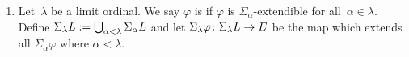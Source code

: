 \documentclass[main.tex]{subfiles}
\begin{document}
\begin{dfn}
\begin{enumerate}
\item
Let~$\lambda$ be a limit ordinal.
We say $\varphi$ is 
if $\varphi$ is $\Sigma_\alpha$-extendible
for all~$\alpha \in \lambda$.
Define 
$\Sigma_\lambda L := \textstyle{\bigcup_{\alpha < \lambda} \Sigma_\alpha L}$
and let $\Sigma_\lambda \varphi\colon \Sigma_\lambda L\rightarrow E$
be the map which extends
all $\Sigma_\alpha \varphi$ where $\alpha <\lambda$.
\end{enumerate}
\end{dfn}
\end{document}
